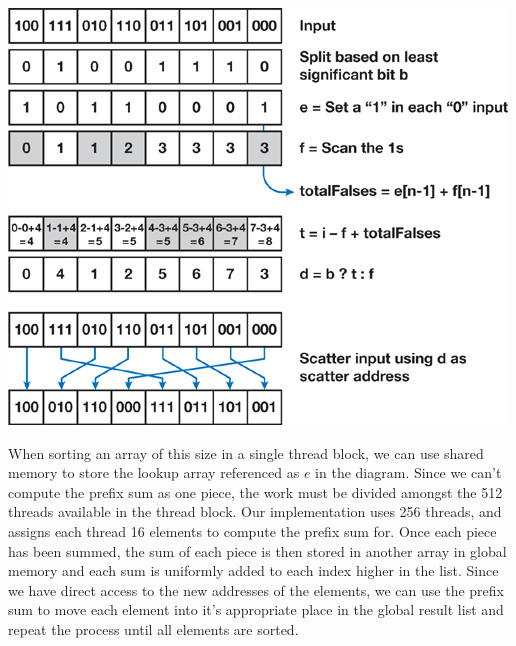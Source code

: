 \documentclass[12pt]{article}
\renewcommand{\indent}{\hspace{0.25in}}
\begin{document}
\begin{center}
\includegraphics[scale=0.5]{nvidia-stuff.jpg}
\end{center}
\indent When sorting an array of this size in a single thread block, we can use shared memory to store the lookup array referenced as $e$ in the diagram.  Since we can't compute the prefix sum as one piece, the work must be divided amongst the 512 threads available in the thread block.  Our implementation uses 256 threads, and assigns each thread 16 elements to compute the prefix sum for.  Once each piece has been summed, the sum of each piece is then stored in another array in global memory and each sum is uniformly added to each index higher in the list.  Since we have direct access to the new addresses of the elements, we can use the prefix sum to move each element into it's appropriate place in the global result list and repeat the process until all elements are sorted.
\end{document}
